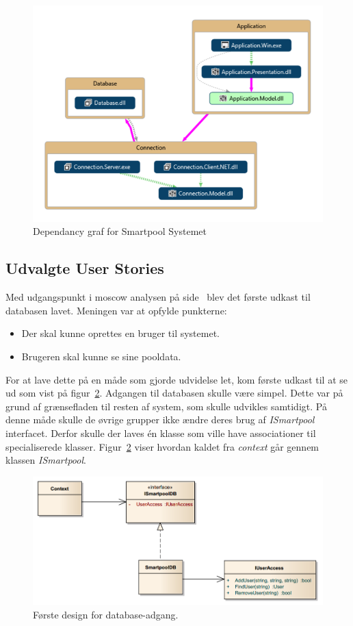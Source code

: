 \begin{figure}[h]
	\centering
	\includegraphics[width=0.8\linewidth]{figs/design/vs_codeMap.PNG}
	\caption{Dependancy graf for Smartpool Systemet}
	\label{fig:vs_codeMap}
\end{figure}

\subsection{Udvalgte User Stories}

Med udgangspunkt i \gls{moscow} analysen på side~\pageref{sec:moscow} blev det første udkast til databasen lavet. Meningen var at opfylde punkterne: 

\begin{itemize}
	\item Der skal kunne oprettes en bruger til systemet.
	\item Brugeren skal kunne se sine pooldata.
\end{itemize}

For at lave dette på en måde som gjorde udvidelse let, kom første udkast til at se ud som vist på figur~\ref{fig:database_class_1}. Adgangen til databasen skulle være simpel. Dette var på grund af grænsefladen til resten af system, som skulle udvikles samtidigt. På denne måde skulle de øvrige grupper ikke ændre deres brug af \textit{ISmartpool} interfacet.  Derfor skulle der laves én klasse som ville have associationer til specialiserede klasser. Figur~\ref{fig:database_class_1} viser hvordan kaldet fra \textit{context} går gennem klassen \textit{ISmartpool}.

\begin{figure}[h]
	\centering
	\includegraphics[width=0.9\linewidth]{figs/design/database_class_1}
	\caption{Første design for database-adgang.}
	\label{fig:database_class_1}
\end{figure}

